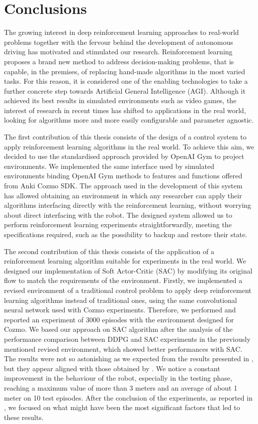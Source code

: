 \chapter{Conclusions} \label{ch:ch6}

The growing interest in deep reinforcement learning approaches to real-world problems together with the fervour behind the development of autonomous driving has motivated and stimulated our research.
Reinforcement learning proposes a brand new method to address decision-making problems, that is capable, in the premises, of replacing hand-made algorithms in the most varied tasks.
For this reason, it is considered one of the enabling technologies to take a further concrete step towards Artificial General Intelligence (AGI).
Although it achieved its best results in simulated environments such as video games, the interest of research in recent times has shifted to applications in the real world, looking for algorithms more and more easily configurable and parameter agnostic.

The first contribution of this thesis consists of the design of a control system to apply reinforcement learning algorithms in the real world.
To achieve this aim, we decided to use the standardised approach provided by OpenAI Gym to project environments.
We implemented the same interface used by simulated environments binding OpenAI Gym methods to features and functions offered from Anki Cozmo SDK.
The approach used in the development of this system has allowed obtaining an environment in which any researcher can apply their algorithms interfacing directly with the reinforcement learning, without worrying about direct interfacing with the robot. 
The designed system allowed us to perform reinforcement learning experiments straightforwardly, meeting the specifications required, such as the possibility to backup and restore their state.

The second contribution of this thesis consists of the application of a reinforcement learning algorithm suitable for experiments in the real world. We designed our implementation of Soft Actor-Critic (SAC) by modifying its original flow to match the requirements of the environment. Firstly, we implemented a revised environment of a traditional control problem to apply deep reinforcement learning algorithms instead of traditional ones, using the same convolutional neural network used with Cozmo experiments.
Therefore, we performed and reported an experiment of 3000 episodes with the environment designed for Cozmo.
We based our approach on SAC algorithm after the analysis of the performance comparison between DDPG and SAC experiments in the previously mentioned revised environment, which showed better performances with SAC.
The results were not so astonishing as we expected from the results presented in \cite{kendall2018learning,kendall2019learning}, but they appear aligned with those obtained by \cite{haarnoja2018alg}.
We notice a constant improvement in the behaviour of the robot, especially in the testing phase, reaching a maximum value of more than 3 meters and an average of about 1 meter on 10 test episodes.
After the conclusion of the experiments, as reported in \label{ch5:results}, we focused on what might have been the most significant factors that led to these results.


